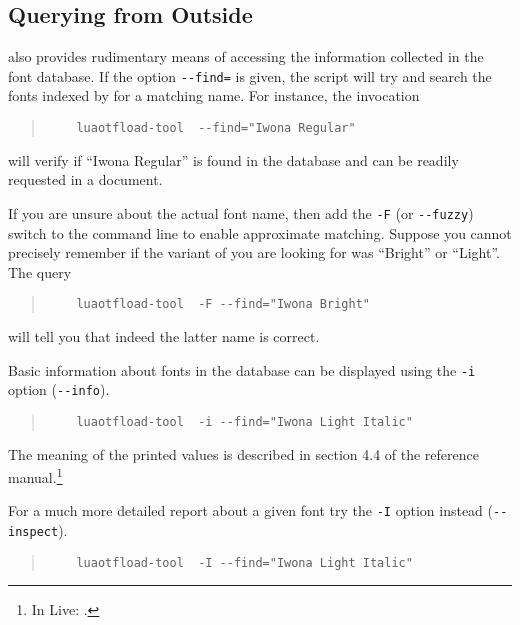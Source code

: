 \subsection{Querying from Outside}

 also provides rudimentary means of
accessing the information collected in the font database.
%
If the option \verb|--find=| is given, the script will
try and search the fonts indexed by  for a
matching name.
%
For instance, the invocation

\begin{quote}
  \begin{verbatim}
    luaotfload-tool  --find="Iwona Regular"
  \end{verbatim}
\end{quote}

\noindent
will verify if “Iwona Regular” is found in the database and can be
readily requested in a document.

If you are unsure about the actual font name, then add the
\verb|-F| (or \verb|--fuzzy|) switch to the command line to enable
approximate matching.
%
Suppose you cannot precisely remember if the variant of
 you are looking for was “Bright” or “Light”.
The query

\begin{quote}
  \begin{verbatim}
    luaotfload-tool  -F --find="Iwona Bright"
  \end{verbatim}
\end{quote}

\noindent
will tell you that indeed the latter name is correct.

Basic information about fonts in the database can be displayed
using the \verb|-i| option (\verb|--info|).
%
\begin{quote}
  \begin{verbatim}
    luaotfload-tool  -i --find="Iwona Light Italic"
  \end{verbatim}
\end{quote}
%
\noindent
The meaning of the printed values is described in section 4.4 of the
\LUATEX reference manual.\footnote{%
  In \TEX Live: .
}

For a much more detailed report about a given font try the \verb|-I| option
instead (\verb|--inspect|).
\begin{quote}
  \begin{verbatim}
    luaotfload-tool  -I --find="Iwona Light Italic"
  \end{verbatim}
\end{quote}

